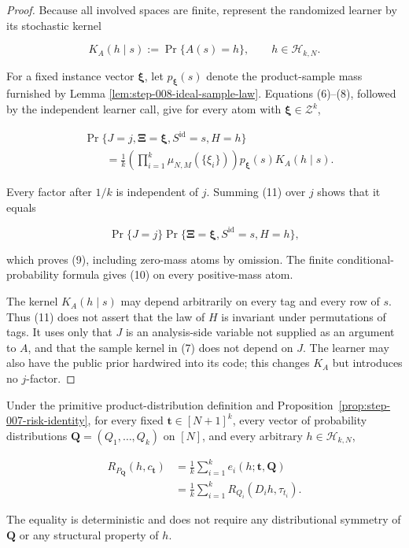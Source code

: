 \begin{proof}
Because all involved spaces are finite, represent the randomized learner by
its stochastic kernel

\[
K_A(h\mid s):=\Pr\{A(s)=h\},
\qquad h\in\mathcal H_{k,N}.
\]

For a fixed instance vector \(\boldsymbol\xi\), let
\(p_{\boldsymbol\xi}(s)\) denote the product-sample mass furnished by
Lemma \ref{lem:step-008-ideal-sample-law}. Equations (6)--(8), followed by
the independent learner call, give for every atom with
\(\boldsymbol\xi\in\mathcal Z^k\),

\[
\begin{aligned}
&\Pr\{J=j,\boldsymbol\Xi=\boldsymbol\xi,
       S^{\mathrm{id}}=s,H=h\}\\
&\qquad=\frac1k
  \left(\prod_{i=1}^k\mu_{N,M}(\{\xi_i\})\right)
  p_{\boldsymbol\xi}(s)K_A(h\mid s).
\end{aligned}
\tag{11}
\]

Every factor after \(1/k\) is independent of \(j\). Summing (11) over
\(j\) shows that it equals

\[
\Pr\{J=j\}\Pr\{\boldsymbol\Xi=\boldsymbol\xi,
S^{\mathrm{id}}=s,H=h\},
\]

which proves (9), including zero-mass atoms by omission. The finite
conditional-probability formula gives (10) on every positive-mass atom.

The kernel \(K_A(h\mid s)\) may depend arbitrarily on every tag and every
row of \(s\). Thus (11) does not assert that the law of \(H\) is invariant
under permutations of tags. It uses only that \(J\) is an analysis-side
variable not supplied as an argument to \(A\), and that the sample kernel
in (7) does not depend on \(J\). The learner may also have the public prior
hardwired into its code; this changes \(K_A\) but introduces no \(j\)-factor.
\end{proof}

\begin{proposition}\label{prop:step-008-risk-decomposition}
Under the primitive product-distribution definition and Proposition~\ref{prop:step-007-risk-identity}, for every fixed
\(\boldsymbol t\in[N+1]^k\), every vector of probability distributions
\(\boldsymbol Q=(Q_1,\ldots,Q_k)\) on \([N]\), and every arbitrary
\(h\in\mathcal H_{k,N}\),

\[
\begin{aligned}
R_{P_{\boldsymbol Q}}(h,c_{\boldsymbol t})
&=\frac1k\sum_{i=1}^k e_i(h;\boldsymbol t,\boldsymbol Q)\\
&=\frac1k\sum_{i=1}^k
  R_{Q_i}(D_i h,\tau_{t_i}).
\end{aligned}
\tag{12}
\]

The equality is deterministic and does not require any distributional
symmetry of \(\boldsymbol Q\) or any structural property of \(h\).
\end{proposition}

